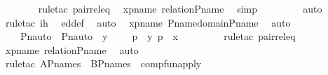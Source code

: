 \begin{isabellebody}
\ \ \ \ \ \ \isamarkupfalse%
\ {\isacharparenleft}{\kern0pt}rule{\isacharunderscore}{\kern0pt}tac\ pair{\isacharunderscore}{\kern0pt}rel{\isacharunderscore}{\kern0pt}eq{\isacharparenright}{\kern0pt}\ \isamarkupfalse%
\ xpname\ relation{\isacharunderscore}{\kern0pt}P{\isacharunderscore}{\kern0pt}name\ \isamarkupfalse%
\ simp\ \isanewline
\ \ \ \ \ \ \isamarkupfalse%
\ auto\ \isamarkupfalse%
\ {\isacharparenleft}{\kern0pt}rule{\isacharunderscore}{\kern0pt}tac\ ih{\isacharparenright}{\kern0pt}\ \isamarkupfalse%
\ ed{\isacharunderscore}{\kern0pt}def\ \isamarkupfalse%
\ auto\ \isamarkupfalse%
\ xpname\ P{\isacharunderscore}{\kern0pt}name{\isacharunderscore}{\kern0pt}domain{\isacharunderscore}{\kern0pt}P{\isacharunderscore}{\kern0pt}name\ \isamarkupfalse%
\ auto\ \isanewline
\ \ \ \ \isamarkupfalse%
\ \isamarkupfalse%
\ {\isachardoublequoteopen}{\isachardot}{\kern0pt}{\isachardot}{\kern0pt}{\isachardot}{\kern0pt}\ {\isacharequal}{\kern0pt}\ {\isacharbraceleft}{\kern0pt}\ {\isacharless}{\kern0pt}Pn{\isacharunderscore}{\kern0pt}auto{\isacharparenleft}{\kern0pt}{\isasympi}{\isacharparenright}{\kern0pt}\ {\isacharbackquote}{\kern0pt}\ {\isacharparenleft}{\kern0pt}Pn{\isacharunderscore}{\kern0pt}auto{\isacharparenleft}{\kern0pt}{\isasymtau}{\isacharparenright}{\kern0pt}\ {\isacharbackquote}{\kern0pt}\ y{\isacharparenright}{\kern0pt}{\isacharcomma}{\kern0pt}\ {\isasympi}\ {\isacharbackquote}{\kern0pt}\ {\isacharparenleft}{\kern0pt}{\isasymtau}\ {\isacharbackquote}{\kern0pt}\ p{\isacharparenright}{\kern0pt}{\isachargreater}{\kern0pt}\ {\isachardot}{\kern0pt}\ {\isacharless}{\kern0pt}y{\isacharcomma}{\kern0pt}\ p{\isachargreater}{\kern0pt}\ {\isasymin}\ x\ {\isacharbraceright}{\kern0pt}{\isachardoublequoteclose}\isanewline
\ \ \ \ \ \ \isamarkupfalse%
\ {\isacharparenleft}{\kern0pt}rule{\isacharunderscore}{\kern0pt}tac\ pair{\isacharunderscore}{\kern0pt}rel{\isacharunderscore}{\kern0pt}eq{\isacharparenright}{\kern0pt}\ \isamarkupfalse%
\ xpname\ relation{\isacharunderscore}{\kern0pt}P{\isacharunderscore}{\kern0pt}name\ \isamarkupfalse%
\ auto\ \isanewline
\ \ \ \ \ \ \isamarkupfalse%
\ {\isacharparenleft}{\kern0pt}rule{\isacharunderscore}{\kern0pt}tac\ A{\isacharequal}{\kern0pt}P{\isacharunderscore}{\kern0pt}names\ \ B{\isacharequal}{\kern0pt}P{\isacharunderscore}{\kern0pt}names\ \ comp{\isacharunderscore}{\kern0pt}fun{\isacharunderscore}{\kern0pt}apply{\isacharparenright}{\kern0pt}\ \isamarkupfalse%

\end{isabellebody}
